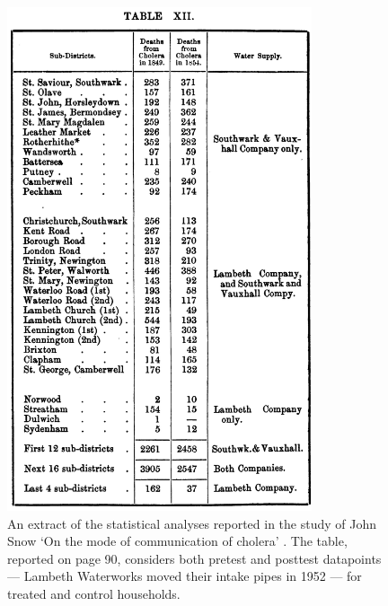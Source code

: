 \begin{refsection}
\begin{figure}
  \begin{small}
    \begin{center}
      \includegraphics[width=0.8\textwidth]{exhibits/snow_natural_experiment.png}
    \end{center}
    \caption{An extract of the statistical analyses reported in the study of John 
    Snow `On the mode of communication of cholera' \autocite*{snow_1855}. The 
    table, reported on page 90, considers both pretest and posttest datapoints ---
    Lambeth Waterworks moved their intake pipes in 1952 --- for treated 
    and control households.}
    \label{fig:snow_natural_experiment}
  \end{small}
\end{figure}


\end{refsection}
